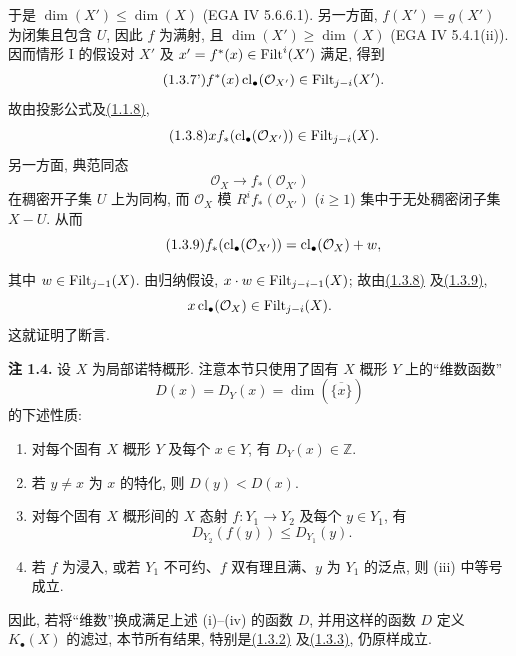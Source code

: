 于是 $\dim(X')\leq\dim(X)$ (EGA IV 5.6.6.1). 另一方面, $f(X')=g(X')$ 为闭集且包含 $U$, 因此 $f$ 为满射, 且 $\dim(X')\geq\dim(X)$ (EGA IV 5.4.1(ii)). 因而情形 I 的假设对 $X'$ 及 $x'=f^*(x)\in\operatorname{Filt}^i(X')$ 满足, 得到
%
%
%
\begin{equation}\tag{1.3.7'}
f^*(x)\operatorname{cl}_\bullet(\mathcal O_{X'})\in\operatorname{Filt}_{j-i}(X').
\end{equation}
故由投影公式及\hyperlink{sga6.e10.prop.1-1-8}{(1.1.8)},
\begin{equation}\tag{1.3.8}
x f_*(\operatorname{cl}_\bullet(\mathcal O_{X'}))\in\operatorname{Filt}_{j-i}(X).
\end{equation}
另一方面, 典范同态
\[
\mathcal O_X\longrightarrow f_*(\mathcal O_{X'})
\]
在稠密开子集 $U$ 上为同构, 而 $\mathcal O_X$ 模 $R^if_*(\mathcal O_{X'})$ ($i\geq1$) 集中于无处稠密闭子集 $X-U$. 从而
%
%
\begin{equation}\tag{1.3.9}
f_*(\operatorname{cl}_\bullet(\mathcal O_{X'}))=\operatorname{cl}_\bullet(\mathcal O_X)+w,
\end{equation}

其中 $w\in\operatorname{Filt}_{j-1}(X)$. 由归纳假设, $x\cdot w\in\operatorname{Filt}_{j-i-1}(X)$; 故由\hyperlink{sga6.e10.eq.1-3-8}{(1.3.8)} 及\hyperlink{sga6.e10.eq.1-3-9}{(1.3.9)},
%
\[
x\operatorname{cl}_\bullet(\mathcal O_X)\in\operatorname{Filt}_{j-i}(X).
\]
这就证明了断言.

\textbf{注 1.4.} 设 $X$ 为局部诺特概形. 注意本节只使用了固有 $X$ 概形 $Y$ 上的“维数函数”
%
%
\[
D(x)=D_Y(x)=\dim(\overline{\{x\}})
\]
的下述性质:
\begin{enumerate}[label=(\roman*)]
\item 对每个固有 $X$ 概形 $Y$ 及每个 $x\in Y$, 有 $D_Y(x)\in\mathbb Z$. \item 若 $y\ne x$ 为 $x$ 的特化, 则 $D(y)<D(x)$. \item 对每个固有 $X$ 概形间的 $X$ 态射 $f:Y_1\to Y_2$ 及每个 $y\in Y_1$, 有
%
%
%
%
  \[
  D_{Y_2}(f(y))\leq D_{Y_1}(y).
  \]
\item 若 $f$ 为浸入, 或若 $Y_1$ 不可约、$f$ 双有理且满、$y$ 为 $Y_1$ 的泛点, 则 (iii) 中等号成立.
%
%
\end{enumerate}
因此, 若将“维数”换成满足上述 (i)--(iv) 的函数 $D$, 并用这样的函数 $D$ 定义 $K_\bullet(X)$ 的滤过, 本节所有结果, 特别是\hyperlink{sga6.e10.thm.1-3-2}{(1.3.2)} 及\hyperlink{sga6.e10.cor.1-3-3}{(1.3.3)}, 仍原样成立.
%
%
%

